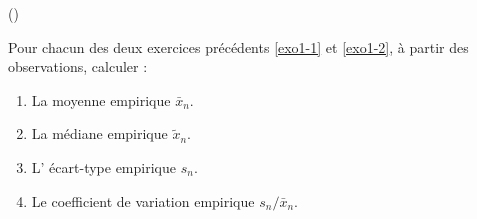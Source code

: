 \begin{exercice}\label{exo1-3} (\minsyndical)

Pour chacun des deux exercices pr\'ec\'edents \ref{exo1-1} et \ref{exo1-2}, \`a partir
des observations, calculer :

\begin{enumerate}

\item La moyenne empirique $\bar{x}_n$.

\item La m\'ediane empirique $\tilde{x}_n$.

\item L' \'ecart-type empirique $s_n$.

\item Le coefficient de variation empirique $s_n / \bar{x}_n$.


\end{enumerate}


\end{exercice}
